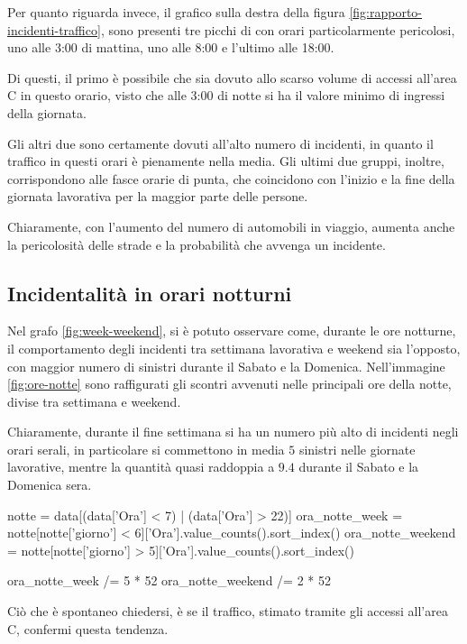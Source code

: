 \documentclass[a4paper,12pt]{report}
\begin{document}
Per quanto riguarda invece, il grafico sulla destra della 
figura \ref{fig:rapporto-incidenti-traffico}, sono presenti tre picchi di 
con orari particolarmente pericolosi, uno alle 3:00 di mattina, uno alle 
8:00 e l'ultimo alle 18:00. 

Di questi, il primo è possibile che sia dovuto allo scarso volume di accessi 
all'area C in questo orario, visto che alle 3:00 di notte si ha il valore minimo di 
ingressi della giornata. 

Gli altri due sono certamente dovuti all'alto 
numero di incidenti, in quanto il traffico in questi orari è pienamente nella media. 
Gli ultimi due gruppi, inoltre, corrispondono alle fasce orarie di punta, che coincidono 
con l'inizio e la fine della giornata lavorativa per la maggior parte delle persone. 

Chiaramente, con l'aumento del numero di automobili in viaggio, aumenta anche 
la pericolosità delle strade e la probabilità che avvenga un incidente. 

\subsection{Incidentalità in orari notturni}

Nel grafo \ref{fig:week-weekend}, si è potuto osservare come, durante le 
ore notturne, il comportamento degli incidenti tra settimana lavorativa e weekend 
sia l'opposto, con maggior numero di sinistri durante il 
Sabato e la Domenica. 
Nell'immagine \ref{fig:ore-notte} sono raffigurati gli scontri avvenuti 
nelle principali ore della notte, divise tra settimana e weekend. 

Chiaramente, durante il fine settimana si ha un numero 
più alto di incidenti negli orari serali, 
in particolare si commettono in media $5$ sinistri nelle giornate lavorative, 
mentre la quantità quasi raddoppia a $9.4$ durante il Sabato e la Domenica sera. 

\begin{code}
notte = data[(data['Ora'] < 7) | (data['Ora'] > 22)]
ora_notte_week = notte[notte['giorno'] < 6]['Ora'].value_counts().sort_index()
ora_notte_weekend = notte[notte['giorno'] > 5]['Ora'].value_counts().sort_index()

ora_notte_week /= 5 * 52  
ora_notte_weekend /= 2 * 52
\end{code}

Ciò che è spontaneo chiedersi, è se 
il traffico, stimato tramite gli accessi all'area C, confermi questa tendenza. 
\end{document}
